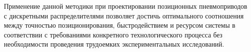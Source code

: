 Применение данной методики при проектировании позиционных пневмоприводов с
дискретными распределителями позволяет достичь оптимального соотношения между
точностью позиционирования, быстродействием и ресурсом системы в соответствии
с требованиями конкретного технологического процесса без необходимости проведения
трудоемких экспериментальных исследований.










